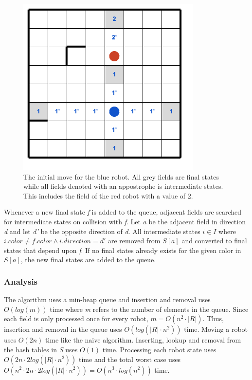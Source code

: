 \documentclass[]{article}
\begin{document}
\begin{figure}[htb]
\centering
\includegraphics[width=0.6\linewidth]{img/stateless.png}
\caption{The initial move for the blue robot. All grey fields are final states while all fields denoted with an appostrophe is intermediate states. This includes the field of the red robot with a value of 2.}
\label{fig:stateless}
\end{figure}

Whenever a new final state \emph{f} is added to the queue, adjacent
fields are searched for intermediate states on collision with \emph{f}.
Let \emph{a} be the adjacent field in direction \emph{d} and let
\emph{d'} be the opposite direction of \emph{d}. All intermediate states
\(i \in I\) where \(i.color \neq f.color \land i.direction = d'\) are
removed from \(S[a]\) and converted to final states that depend upon
\emph{f}. If no final states already exists for the given color in
\(S[a]\), the new final states are added to the queue.

\subsubsection{Analysis}\label{analysis}

The algorithm uses a min-heap queue and insertion and removal uses
\(O(log(m))\) time where \emph{m} refers to the number of elements in
the queue. Since each field is only processed once for every robot,
\(m=O(n^2 \cdot |R|)\). Thus, insertion and removal in the queue uses
\(O(log(|R| \cdot n^2))\) time. Moving a robot uses \(O(2n)\) time like
the naive algorithm. Inserting, lookup and removal from the hash tables
in \emph{S} uses \(O(1)\) time. Processing each robot state uses
\(O(2n \cdot 2log(|R| \cdot n^2))\) time and the total worst case uses
\(O(n^2 \cdot 2n \cdot 2log(|R| \cdot n^2)) = O(n^3 \cdot log(n^2))\)
time.
\end{document}

